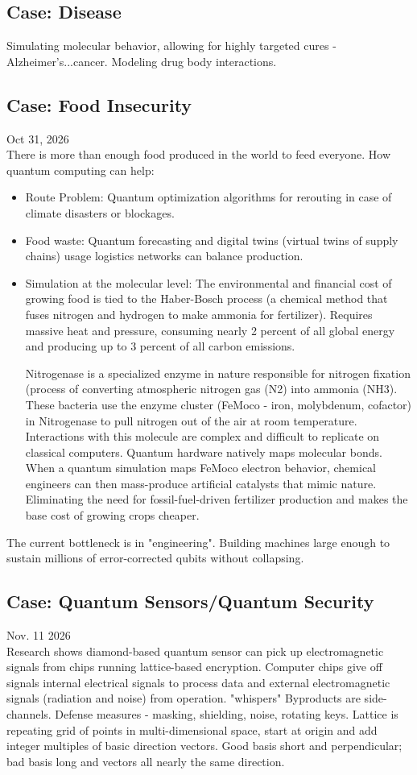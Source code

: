 \documentclass{article}
\begin{document}
\subsection{Case: Disease }
Simulating molecular behavior, allowing for highly targeted cures - Alzheimer's...cancer. Modeling drug body interactions. 
\subsection{Case: Food Insecurity}
Oct 31, 2026 \\
There is more than enough food produced in the world to feed everyone. How quantum computing can help: 
\begin{itemize}
    \item Route Problem: Quantum optimization algorithms for rerouting in case of climate disasters or blockages. 
    \item Food waste: Quantum forecasting and digital twins (virtual twins of supply chains) usage logistics networks can balance production.
    \item Simulation at the molecular level: The environmental and financial cost of growing food is tied to the Haber-Bosch process (a chemical method that fuses nitrogen and hydrogen to make ammonia for fertilizer). Requires massive heat and pressure, consuming nearly 2 percent of all global energy and producing up to 3 percent of all carbon emissions. 
    
    Nitrogenase is a specialized enzyme in nature responsible for nitrogen fixation (process of converting atmospheric nitrogen gas (N2) into ammonia (NH3). These bacteria use the enzyme cluster (FeMoco - iron, molybdenum, cofactor) in Nitrogenase to pull nitrogen out of the air at room temperature. Interactions with this molecule are complex and difficult to replicate on classical computers. Quantum hardware natively maps molecular bonds. When a quantum simulation maps FeMoco electron behavior, chemical engineers can then mass-produce artificial catalysts that mimic nature. Eliminating the need for fossil-fuel-driven fertilizer production and makes the base cost of growing crops cheaper. 

\end{itemize}

The current bottleneck is in "engineering". Building machines large enough to sustain millions of error-corrected qubits without collapsing.  

\subsection{Case: Quantum Sensors/Quantum Security}
Nov. 11 2026 \\
Research shows diamond-based quantum sensor can pick up electromagnetic signals from chips running lattice-based encryption. Computer chips give off signals internal electrical signals to process data and external electromagnetic signals (radiation and noise) from operation. "whispers" Byproducts are side-channels. Defense measures - masking, shielding, noise, rotating keys. Lattice is repeating grid of points in multi-dimensional space, start at origin and add integer multiples of basic direction vectors. Good basis short and perpendicular; bad basis long and vectors all nearly the same direction. 
\end{document}
